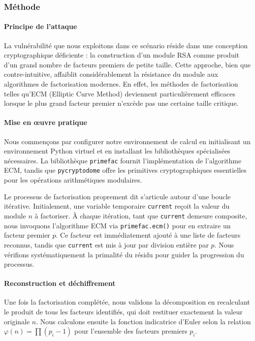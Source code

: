 \subsubsection{Méthode}
\paragraph{Principe de l'attaque}
La vulnérabilité que nous exploitons dans ce scénario réside dans une conception cryptographique déficiente : la construction d’un module RSA comme produit d’un grand nombre de facteurs premiers de petite taille. Cette approche, bien que contre-intuitive, affaiblit considérablement la résistance du module aux algorithmes de factorisation modernes. En effet, les méthodes de factorisation telles qu’ECM (Elliptic Curve Method) deviennent particulièrement efficaces lorsque le plus grand facteur premier n’excède pas une certaine taille critique.


\paragraph{Mise en œuvre pratique}
Nous commençons par configurer notre environnement de calcul en initialisant un environnement Python virtuel et en installant les bibliothèques spécialisées nécessaires. La bibliothèque \texttt{primefac} fournit l’implémentation de l’algorithme ECM, tandis que \texttt{pycryptodome} offre les primitives cryptographiques essentielles pour les opérations arithmétiques modulaires.

Le processus de factorisation proprement dit s’articule autour d’une boucle itérative. Initialement, une variable temporaire \texttt{current} reçoit la valeur du module $n$ à factoriser. À chaque itération, tant que \texttt{current} demeure composite, nous invoquons l’algorithme ECM via \texttt{primefac.ecm()} pour en extraire un facteur premier $p$. Ce facteur est immédiatement ajouté à une liste de facteurs reconnus, tandis que \texttt{current} est mis à jour par division entière par $p$. Nous vérifions systématiquement la primalité du résidu pour guider la progression du processus.


\paragraph{Reconstruction et déchiffrement}
Une fois la factorisation complétée, nous validons la décomposition en recalculant le produit de tous les facteurs identifiés, qui doit restituer exactement la valeur originale $n$. Nous calculons ensuite la fonction indicatrice d’Euler selon la relation $\varphi(n) = \prod (p_i - 1)$ pour l’ensemble des facteurs premiers $p_i$.

